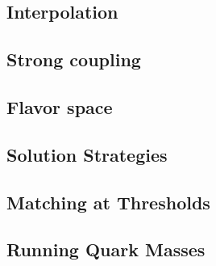 \subsection{Interpolation}
\label{sec:theory:interpolation}


\subsection{Strong coupling}
\label{sec:theory:coupling}


\subsection{Flavor space}
\label{sec:theory:flavor}


\subsection{Solution Strategies}
\label{sec:theory:solutions}


\subsection{Matching at Thresholds}
\label{sec:theory:matching}


\subsection{Running Quark Masses}
\label{sec:theory:msbarmass}

